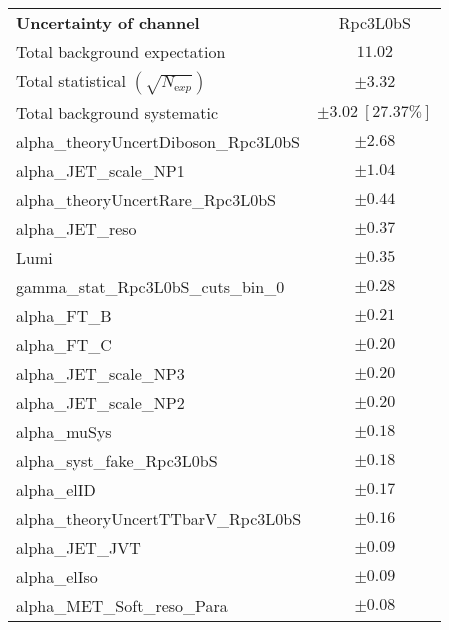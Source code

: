 
\begin{table}
\begin{center}
\setlength{\tabcolsep}{0.0pc}
\begin{tabular*}{\textwidth}{@{\extracolsep{\fill}}lc}
\noalign{\smallskip}\hline\noalign{\smallskip}
{\bfseries Uncertainty of channel}                                    & Rpc3L0bS            \\
\noalign{\smallskip}\hline\noalign{\smallskip}
Total background expectation             &  $11.02$       \\
\noalign{\smallskip}\hline\noalign{\smallskip}
Total statistical $(\sqrt{N_{\mathrm exp}})$              & $\pm 3.32$       \\
Total background systematic               & $\pm 3.02\ [27.37\%] $             \\
\noalign{\smallskip}\hline\noalign{\smallskip}
\noalign{\smallskip}\hline\noalign{\smallskip}
alpha\_theoryUncertDiboson\_Rpc3L0bS         & $\pm 2.68$       \\
alpha\_JET\_scale\_NP1         & $\pm 1.04$       \\
alpha\_theoryUncertRare\_Rpc3L0bS         & $\pm 0.44$       \\
alpha\_JET\_reso         & $\pm 0.37$       \\
Lumi         & $\pm 0.35$       \\
gamma\_stat\_Rpc3L0bS\_cuts\_bin\_0         & $\pm 0.28$       \\
alpha\_FT\_B         & $\pm 0.21$       \\
alpha\_FT\_C         & $\pm 0.20$       \\
alpha\_JET\_scale\_NP3         & $\pm 0.20$       \\
alpha\_JET\_scale\_NP2         & $\pm 0.20$       \\
alpha\_muSys         & $\pm 0.18$       \\
alpha\_syst\_fake\_Rpc3L0bS         & $\pm 0.18$       \\
alpha\_elID         & $\pm 0.17$       \\
alpha\_theoryUncertTTbarV\_Rpc3L0bS         & $\pm 0.16$       \\
alpha\_JET\_JVT         & $\pm 0.09$       \\
alpha\_elIso         & $\pm 0.09$       \\
alpha\_MET\_Soft\_reso\_Para         & $\pm 0.08$       \\

\end{tabular*}
\end{center}
\end{table}
